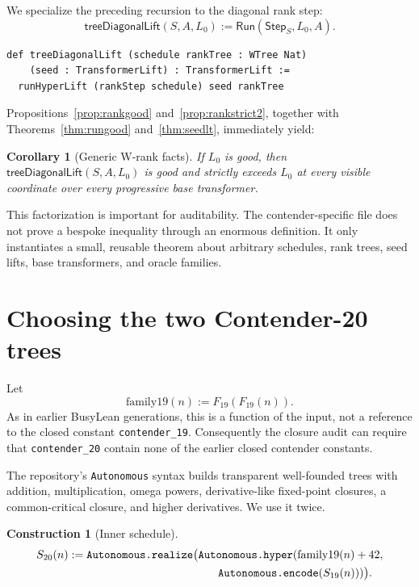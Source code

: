 \documentclass[11pt]{article}
\newtheorem{corollary}[theorem]{Corollary}
\theoremstyle{definition}
\newtheorem{construction}[theorem]{Construction}
\theoremstyle{remark}
\newcommand{\code}[1]{\texttt{#1}}
\newcommand{\Step}{\mathsf{Step}}
\newcommand{\Run}{\mathsf{Run}}
\begin{document}
We specialize the preceding recursion to the diagonal rank step:
\[
\mathsf{treeDiagonalLift}(S,A,L_0)
:=\Run(\Step_S,L_0,A).
\]

\begin{lstlisting}
def treeDiagonalLift (schedule rankTree : WTree Nat)
    (seed : TransformerLift) : TransformerLift :=
  runHyperLift (rankStep schedule) seed rankTree
\end{lstlisting}

Propositions~\ref{prop:rankgood} and~\ref{prop:rankstrict2}, together with
Theorems~\ref{thm:rungood} and~\ref{thm:seedlt}, immediately yield:

\begin{corollary}[Generic W-rank facts]\label{cor:generic}
If \(L_0\) is good, then
\(\mathsf{treeDiagonalLift}(S,A,L_0)\) is good and strictly exceeds \(L_0\)
at every visible coordinate over every progressive base transformer.
\end{corollary}

This factorization is important for auditability.  The contender-specific file
does not prove a bespoke inequality through an enormous definition.  It only
instantiates a small, reusable theorem about arbitrary schedules, rank trees,
seed lifts, base transformers, and oracle families.

\section{Choosing the two Contender-20 trees}

Let
\[
\mathrm{family19}(n):=F_{19}(F_{19}(n)).
\]
As in earlier BusyLean generations, this is a function of the input, not a
reference to the closed constant \code{contender\_19}.  Consequently the
closure audit can require that \code{contender\_20} contain none of the earlier
closed contender constants.

The repository's \code{Autonomous} syntax builds transparent well-founded trees
with addition, multiplication, omega powers, derivative-like fixed-point
closures, a common-critical closure, and higher derivatives.  We use it twice.

\begin{construction}[Inner schedule]
\begin{align*}
S_{20}(n):={}&\code{Autonomous.realize}\bigl(
  \code{Autonomous.hyper}(\mathrm{family19}(n)+42,\\
&\hspace{41mm}\code{Autonomous.encode}(S_{19}(n)))\bigr).
\end{align*}
\end{construction}
\end{document}
